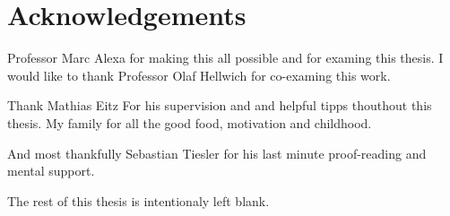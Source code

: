
\chapter*{Acknowledgements}
\thispagestyle{empty}
Professor Marc Alexa for making this all possible and for examing this thesis. 
I would like to thank Professor Olaf Hellwich for co-examing this work. 

Thank Mathias Eitz For his supervision and and helpful tipps thouthout this
thesis. 
My family for all the good food, motivation and childhood. 

And most thankfully Sebastian Tiesler for his last minute proof-reading and
mental support.

The rest of this thesis is intentionaly left blank.

